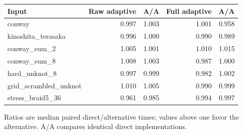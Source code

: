 \begin{center}\small
\begin{tabular}{@{}lrrrr@{}}
\toprule
Input & Raw adaptive & A/A & Full adaptive & A/A \\
\midrule
conway & 0.997 & 1.003 & 1.001 & 0.958 \\
kinoshita\_terasaka & 0.996 & 1.000 & 0.990 & 0.989 \\
conway\_sum\_2 & 1.005 & 1.001 & 1.010 & 1.015 \\
conway\_sum\_8 & 1.008 & 1.003 & 0.987 & 1.000 \\
hard\_unknot\_8 & 0.997 & 0.999 & 0.982 & 1.002 \\
grid\_scrambled\_unknot & 1.010 & 1.005 & 0.990 & 0.999 \\
stress\_braid5\_36 & 0.961 & 0.985 & 0.994 & 0.997 \\
\bottomrule
\end{tabular}
\end{center}
Ratios are median paired direct/alternative times; values above one favor the alternative. A/A compares identical direct implementations.
